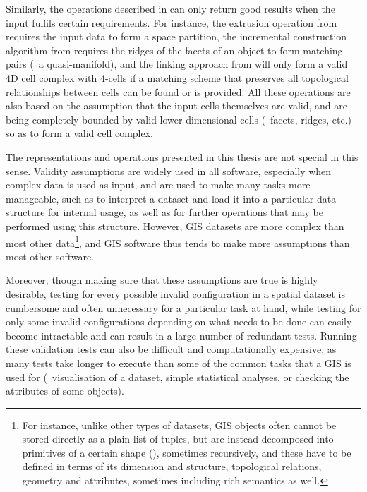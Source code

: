 Similarly, the operations described in  can only return good results when the input fulfils certain requirements.
For instance, the extrusion operation from  requires the input data to form a space partition, the incremental construction algorithm from  requires the ridges of the facets of an object to form matching pairs (\ie\ a quasi-manifold), and the linking approach from  will only form a valid 4D cell complex with 4-cells if a matching scheme that preserves all topological relationships between cells can be found or is provided.
All these operations are also based on the assumption that the input cells themselves are valid, and are being completely bounded by valid lower-dimensional cells (\ie\ facets, ridges, etc.) so as to form a valid cell complex.

The representations and operations presented in this thesis are not special in this sense.
Validity assumptions are widely used in all software, especially when complex data is used as input, and are used to make many tasks more manageable, such as to interpret a dataset and load it into a particular data structure for internal usage, as well as for further operations that may be performed using this structure.
However, GIS datasets are more complex than most other data\footnote{For instance, unlike other types of datasets, GIS objects often cannot be stored directly as a plain list of tuples, but are instead decomposed into primitives of a certain shape (), sometimes recursively, and these have to be defined in terms of its dimension and structure, topological relations, geometry and attributes, sometimes including rich semantics as well.}, and GIS software thus tends to make more assumptions than most other software.

Moreover, though making sure that these assumptions are true is highly desirable, testing for every possible invalid configuration in a spatial dataset is cumbersome and often unnecessary for a particular task at hand, while testing for only some invalid configurations depending on what needs to be done can easily become intractable and can result in a large number of redundant tests.
Running these validation tests can also be difficult and computationally expensive, as many tests take longer to execute than some of the common tasks that a GIS is used for (\eg\ visualisation of a dataset, simple statistical analyses, or checking the attributes of some objects).

